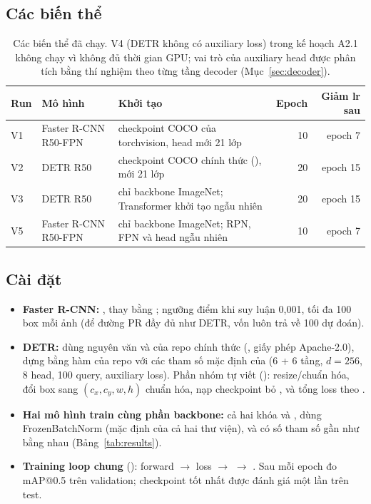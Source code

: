 \documentclass[11pt, a4paper]{article}
\begin{document}
\subsection{Các biến thể}
\begin{table}[H]
  \centering
  \caption{Các biến thể đã chạy. V4 (DETR không có auxiliary loss) trong kế hoạch A2.1 không chạy vì không đủ thời gian GPU; vai trò của auxiliary head được phân tích bằng thí nghiệm theo từng tầng decoder (Mục~\ref{sec:decoder}).}
  \label{tab:variants}
  \small
  \begin{tabularx}{\linewidth}{llYrr}
    \toprule
    \textbf{Run} & \textbf{Mô hình} & \textbf{Khởi tạo} & \textbf{Epoch} & \textbf{Giảm lr sau} \\
    \midrule
    V1 & Faster R-CNN R50-FPN & checkpoint COCO của torchvision, head mới 21 lớp & 10 & epoch 7 \\
    V2 & DETR R50 & checkpoint COCO chính thức (),  mới 21 lớp & 20 & epoch 15 \\
    V3 & DETR R50 & chỉ backbone ImageNet; Transformer khởi tạo ngẫu nhiên & 20 & epoch 15 \\
    V5 & Faster R-CNN R50-FPN & chỉ backbone ImageNet; RPN, FPN và head ngẫu nhiên & 10 & epoch 7 \\
    \bottomrule
  \end{tabularx}
\end{table}

\subsection{Cài đặt}
\begin{itemize}
  \item \textbf{Faster R-CNN:} , thay  bằng ; ngưỡng điểm khi suy luận 0,001, tối đa 100 box mỗi ảnh (để đường PR đầy đủ như DETR, vốn luôn trả về 100 dự đoán).
  \item \textbf{DETR:} dùng nguyên văn  và  của repo chính thức (, giấy phép Apache-2.0), dựng bằng hàm  của repo với các tham số mặc định của  (6 + 6 tầng, $d = 256$, 8 head, 100 query, auxiliary loss). Phần nhóm tự viết (): resize/chuẩn hóa, đổi box sang $(c_x, c_y, w, h)$ chuẩn hóa, nạp checkpoint bỏ , và tổng loss theo .
  \item \textbf{Hai mô hình train cùng phần backbone:} cả hai khóa  và , dùng FrozenBatchNorm (mặc định của cả hai thư viện), và có số tham số gần như bằng nhau (Bảng~\ref{tab:results}).
  \item \textbf{Training loop chung} (): forward $\rightarrow$ loss $\rightarrow$  $\rightarrow$ . Sau mỗi epoch đo mAP@0.5 trên validation; checkpoint tốt nhất được đánh giá một lần trên test.
\end{itemize}
\end{document}
